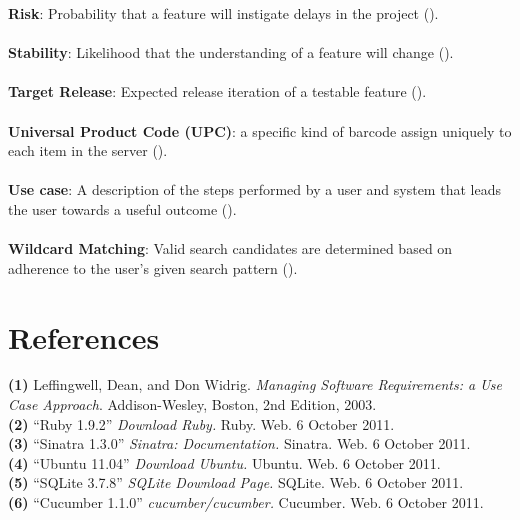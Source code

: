 \documentclass{article}
\begin{document}
\textbf{Risk}: Probability that a feature will instigate delays in the project (\pageref{risk}).\\ \\
\textbf{Stability}: Likelihood that the understanding of a feature will change (\pageref{stability}).\\ \\
\textbf{Target Release}: Expected release iteration of a testable feature (\pageref{target_release}).\\ \\
\textbf{Universal Product Code (UPC)}: a specific kind of barcode assign uniquely to each item in the server (\pageref{upc}).\\ \\
\textbf{Use case}: A description of the steps performed by a user and system that leads the user towards a useful outcome (\pageref{use_case}).\\ \\
\textbf{Wildcard Matching}: Valid search candidates are determined based on adherence to the user's given search pattern (\pageref{feature}).

\section{References}
\hangindent=1.4cm
\textbf{(1)} Leffingwell, Dean, and Don Widrig.
\emph{Managing Software Requirements: a Use Case Approach}.
Addison-Wesley, Boston,
2nd Edition,
2003.\\

\noindent\hangindent=1.4cm
\textbf{(2)} ``Ruby 1.9.2'' 
\emph{Download Ruby.} Ruby. Web.  6 October 2011. \\

\noindent\hangindent=1.4cm
\textbf{(3)} ``Sinatra 1.3.0'' 
\emph{Sinatra: Documentation.} Sinatra. Web.  6 October 2011.\\

\noindent\hangindent=1.4cm
\textbf{(4)} ``Ubuntu 11.04'' 
\emph{Download Ubuntu.} Ubuntu. Web.  6 October 2011.\\

\noindent\hangindent=1.4cm
\textbf{(5)} ``SQLite 3.7.8'' 
\emph{SQLite Download Page.} SQLite. Web.  6 October 2011.\\

\noindent\hangindent=1.4cm
\textbf{(6)} ``Cucumber 1.1.0'' 
\emph{cucumber/cucumber.} Cucumber. Web.  6 October 2011.\\
\end{document}
